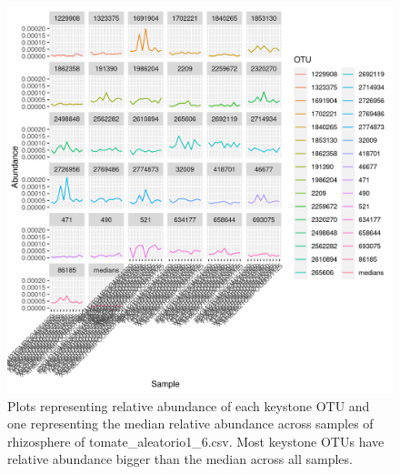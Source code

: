 \begin{figure}
   \centering
   \includegraphics[scale = 0.8]{abundance_tomate_aleatorio1_6.csv_key_otus_medians.png}
   \caption{Plots representing relative abundance of each keystone OTU and one representing the median relative abundance  across samples of rhizosphere of tomate_aleatorio1_6.csv. Most keystone OTUs have relative abundance bigger than the median across all samples.  }
   \label{key_otus_vs_medians_tomate_aleatorio1_6.csv}
\end{figure}
